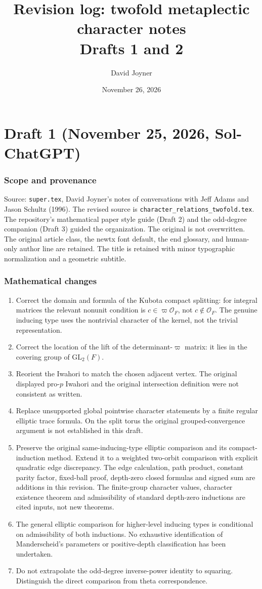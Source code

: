 \documentclass[12pt,letterpaper]{article}
\title{Revision log: twofold metaplectic character notes\\Drafts 1 and 2}
\author{David Joyner}
\date{November 26, 2026}
\begin{document}
\maketitle
\part*{Draft 1 (November 25, 2026, Sol-ChatGPT)}
\section{Scope and provenance}
Source: \texttt{super.tex}, David Joyner's notes of conversations with Jeff Adams and Jason Schultz (1996). The revised source is \texttt{character\_relations\_twofold.tex}. The repository's mathematical paper style guide (Draft 2) and the odd-degree companion (Draft 3) guided the organization. The original is not overwritten. The original article class, the newtx font default, the end glossary, and human-only author line are retained. The title is retained with minor typographic normalization and a geometric subtitle.
\section{Mathematical changes}
\begin{enumerate}
\item Correct the domain and formula of the Kubota compact splitting: for integral matrices the relevant nonunit condition is $c\in\varpi\mathcal O_F$, not $c\notin\mathcal O_F$. The genuine inducing type uses the nontrivial character of the kernel, not the trivial representation.
\item Correct the location of the lift of the determinant-$\varpi$ matrix: it lies in the covering group of $\mathrm{GL}_2(F)$.
\item Reorient the Iwahori to match the chosen adjacent vertex. The original displayed pro-$p$ Iwahori and the original intersection definition were not consistent as written.
\item Replace unsupported global pointwise character statements by a finite regular elliptic trace formula. On the split torus the original grouped-convergence argument is not established in this draft.
\item Preserve the original same-inducing-type elliptic comparison and its compact-induction method. Extend it to a weighted two-orbit comparison with explicit quadratic edge discrepancy. The edge calculation, path product, constant parity factor, fixed-ball proof, depth-zero closed formulas and signed sum are additions in this revision. The finite-group character values, character existence theorem and admissibility of standard depth-zero inductions are cited inputs, not new theorems.
\item The general elliptic comparison for higher-level inducing types is conditional on admissibility of both inductions. No exhaustive identification of Manderscheid's parameters or positive-depth classification has been undertaken.
\item Do not extrapolate the odd-degree inverse-power identity to squaring. Distinguish the direct comparison from theta correspondence.
\end{enumerate}
\end{document}
